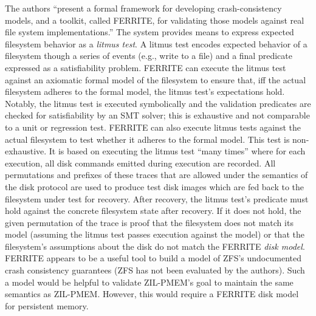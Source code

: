 \documentclass[12pt,a4paper,twoside]{book}
\begin{document}
The authors
“present a formal framework for developing crash-consistency models, and a toolkit, called FERRITE, for validating those models against real file system implementations.”
The system provides means to express expected filesystem behavior as a \textit{litmus test}.
A litmus test encodes expected behavior of a filesystem though a series of events (e.g., write to a file) and a final predicate expressed as a satisfiability problem.
FERRITE can execute the litmus test against an axiomatic formal model of the filesystem to ensure that, iff the actual filesystem adheres to the formal model, the litmus test’s expectations hold.
Notably, the litmus test is executed symbolically and the validation predicates are checked for satisfiability by an SMT solver; this is exhaustive and not comparable to a unit  or regression test.
FERRITE can also execute litmus tests against the actual filesystem to test whether it adheres to the formal model.
This test is non-exhaustive.
It is based on executing the litmus test “many times” where for each execution, all disk commands emitted during execution are recorded.
All permutations and prefixes of these traces that are allowed under the semantics of the disk protocol are used to produce test disk images which are fed back to the filesystem under test for recovery.
After recovery, the litmus test’s predicate must hold against the concrete filesystem state after recovery.
If it does not hold, the given permutation of the trace is proof that the filesystem does not match its model (assuming the litmus test passes execution against the model) or that the filesystem’s assumptions about the disk do not match the FERRITE \textit{disk model}.
FERRITE appears to be a useful tool to build a model of ZFS’s undocumented crash consistency guarantees (ZFS has not been evaluated by the authors).
Such a model would be helpful to validate ZIL-PMEM's goal to maintain the same semantics as ZIL-PMEM.
However, this would require a FERRITE disk model for persistent memory.
\end{document}
